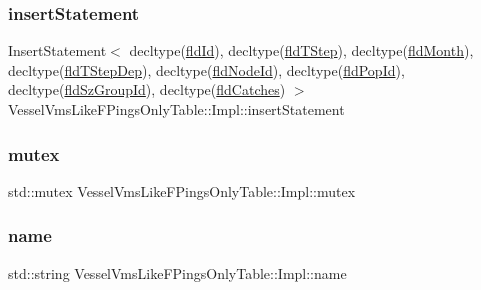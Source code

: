 \subsubsection{\texorpdfstring{insertStatement}{insertStatement}}
{\footnotesize\ttfamily Insert\+Statement$<$ decltype(\mbox{\hyperlink{struct_vessel_vms_like_f_pings_only_table_1_1_impl_af73eb376b1cef5f2c3533e15bd02d10f}{fld\+Id}}), decltype(\mbox{\hyperlink{struct_vessel_vms_like_f_pings_only_table_1_1_impl_ab44c7a92d60077b3a8ed4cb58ba99962}{fld\+T\+Step}}), decltype(\mbox{\hyperlink{struct_vessel_vms_like_f_pings_only_table_1_1_impl_a69548cc286384a7fa217ad5d28eb8db3}{fld\+Month}}), decltype(\mbox{\hyperlink{struct_vessel_vms_like_f_pings_only_table_1_1_impl_af8e8160c7c7c7990ca22da85a8389eea}{fld\+T\+Step\+Dep}}), decltype(\mbox{\hyperlink{struct_vessel_vms_like_f_pings_only_table_1_1_impl_ad5ecf8bd2c86e503d68c816ce4e462ba}{fld\+Node\+Id}}), decltype(\mbox{\hyperlink{struct_vessel_vms_like_f_pings_only_table_1_1_impl_aa316c94f58fdc6dac6d0910580dde58c}{fld\+Pop\+Id}}), decltype(\mbox{\hyperlink{struct_vessel_vms_like_f_pings_only_table_1_1_impl_a1cd399544e9f2db4025c18c2c06c20d0}{fld\+Sz\+Group\+Id}}), decltype(\mbox{\hyperlink{struct_vessel_vms_like_f_pings_only_table_1_1_impl_a52c311e3ec42ee4ee51b959b401cf661}{fld\+Catches}}) $>$ Vessel\+Vms\+Like\+F\+Pings\+Only\+Table\+::\+Impl\+::insert\+Statement}

\mbox{\label{struct_vessel_vms_like_f_pings_only_table_1_1_impl_a3d2fbc81b5a6c47014675dbf58480245}} 
\subsubsection{\texorpdfstring{mutex}{mutex}}
{\footnotesize\ttfamily std\+::mutex Vessel\+Vms\+Like\+F\+Pings\+Only\+Table\+::\+Impl\+::mutex}

\mbox{\label{struct_vessel_vms_like_f_pings_only_table_1_1_impl_a28452263bbd6835bd6f033681a39ddc9}} 
\subsubsection{\texorpdfstring{name}{name}}
{\footnotesize\ttfamily std\+::string Vessel\+Vms\+Like\+F\+Pings\+Only\+Table\+::\+Impl\+::name}

